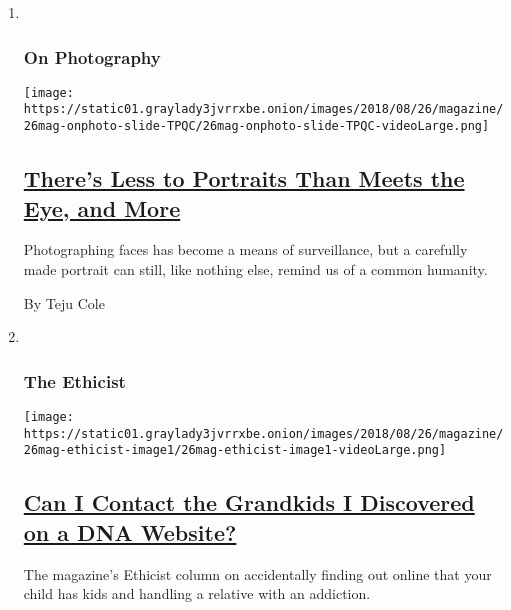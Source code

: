 \begin{enumerate}
\def\labelenumi{\arabic{enumi}.}
\item ~
  \hypertarget{on-photography}{%
  \subsubsection{On Photography}\label{on-photography}}

  \texttt{[image: https://static01.graylady3jvrrxbe.onion/images/2018/08/26/magazine/26mag-onphoto-slide-TPQC/26mag-onphoto-slide-TPQC-videoLarge.png]}

  \hypertarget{theres-less-to-portraits-than-meets-the-eye-and-more}{%
  \subsection{\texorpdfstring{\href{/2018/08/23/magazine/theres-less-to-portraits-than-meets-the-eye-and-more.html}{There's
  Less to Portraits Than Meets the Eye, and
  More}}{There's Less to Portraits Than Meets the Eye, and More}}\label{theres-less-to-portraits-than-meets-the-eye-and-more}}

  Photographing faces has become a means of surveillance, but a
  carefully made portrait can still, like nothing else, remind us of a
  common humanity.

  By Teju Cole
\item ~
  \hypertarget{the-ethicist}{%
  \subsubsection{The Ethicist}\label{the-ethicist}}

  \texttt{[image: https://static01.graylady3jvrrxbe.onion/images/2018/08/26/magazine/26mag-ethicist-image1/26mag-ethicist-image1-videoLarge.png]}

  \hypertarget{can-i-contact-the-grandkids-i-discovered-on-a-dna-website}{%
  \subsection{\texorpdfstring{\href{/2018/08/21/magazine/can-i-contact-the-grandkids-i-discovered-on-a-dna-website.html}{Can
  I Contact the Grandkids I Discovered on a DNA
  Website?}}{Can I Contact the Grandkids I Discovered on a DNA Website?}}\label{can-i-contact-the-grandkids-i-discovered-on-a-dna-website}}

  The magazine's Ethicist column on accidentally finding out online that
  your child has kids and handling a relative with an addiction.


\end{enumerate}
